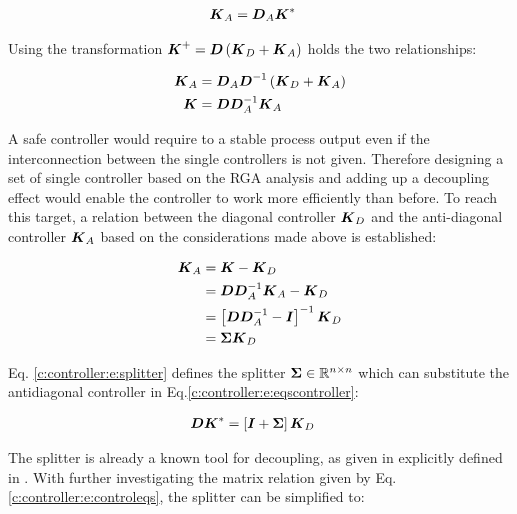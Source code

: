 \begin{align*}
\begin{split}
\mbox{\boldmath$K$}_A &= \mbox{\boldmath$D$}_A \mbox{\boldmath$K$}^* 
\end{split}
\end{align*}

Using the transformation $\mbox{\boldmath$K$}^+ = \mbox{\boldmath$D$} \left( \mbox{\boldmath$K$}_D + \mbox{\boldmath$K$}_A \right)$ holds the two relationships:

\begin{align*}
\mbox{\boldmath$K$}_A &= \mbox{\boldmath$D$}_A \mbox{\boldmath$D$}^{-1} \left( \mbox{\boldmath$K$}_D + \mbox{\boldmath$K$}_A \right) \\
\mbox{\boldmath$K$} &= \mbox{\boldmath$D$}\mbox{\boldmath$D$}_A^{-1} \mbox{\boldmath$K$}_A
\end{align*}

A safe controller would require to a stable process output even if the interconnection between the single controllers is not given. Therefore designing a set of single controller based on the RGA analysis and adding up a decoupling effect would enable the controller to work more efficiently than before. To reach this target, a relation between the diagonal controller $\mbox{\boldmath$K$}_D$ and the anti-diagonal controller $\mbox{\boldmath$K$}_A$ based on the considerations made above is established:

\begin{align}
\begin{split}
\mbox{\boldmath$K$}_A &= \mbox{\boldmath$K$} - \mbox{\boldmath$K$}_D \\
&= \mbox{\boldmath$D$}\mbox{\boldmath$D$}_A^{-1} \mbox{\boldmath$K$}_A - \mbox{\boldmath$K$}_D \\
&= \left[\mbox{\boldmath$D$}\mbox{\boldmath$D$}_A^{-1} - \mbox{\boldmath$I$}  \right]^{-1} \mbox{\boldmath$K$}_D\\
&= \mbox{\boldmath$\Sigma$} \mbox{\boldmath$K$}_D
\end{split}
\label{c:controller:e:splitter}
\end{align}

Eq. \ref{c:controller:e:splitter} defines the splitter $\mbox{\boldmath$\Sigma$} \in \mathbb{R}^{n \times n}$ which can substitute the antidiagonal controller in Eq.\ref{c:controller:e:eqscontroller}:

\begin{align}
\begin{split}
\mbox{\boldmath$D$} \mbox{\boldmath$K$}^* &= \left[ \mbox{\boldmath$I$} + \mbox{\boldmath$\Sigma$} \right] \mbox{\boldmath$K$}_D
\end{split}
\label{c:controller:e:controleqs}
\end{align}

The splitter is already a known tool for decoupling, as given in \cite[p.190 ff.]{Wang2006} explicitly defined in \cite[p.193 Eq.(6.19)]{Wang2006}. With further investigating the matrix relation given by Eq.\ref{c:controller:e:controleqs}, the splitter can be simplified to:

